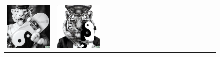 \begin{figure}[ht!]
\begin{adjustwidth}{-0.8in}{-0.5in}
\begin{tabular}{cccccccccccccccccccc}
\multicolumn{2}{c}{\includegraphics[width=\threebythreecolwidth\textwidth]{figures/cherries/tiger4.jpg}} &
\multicolumn{2}{c}{\includegraphics[width=\threebythreecolwidth\textwidth]{figures/cherries/tiger5.jpg}} &

\end{tabular}
\end{adjustwidth}
\end{figure}
